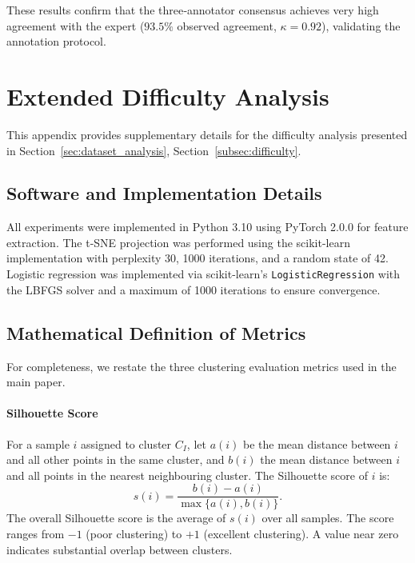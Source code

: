These results confirm that the three‑annotator consensus achieves very high agreement with the expert ($93.5\%$ observed agreement, $\kappa = 0.92$), validating the annotation protocol.










\section{Extended Difficulty Analysis}
\label{app:difficulty}

This appendix provides supplementary details for the difficulty analysis presented in Section~\ref{sec:dataset_analysis}, Section~\ref{subsec:difficulty}.

\subsection{Software and Implementation Details}

All experiments were implemented in Python 3.10 using PyTorch 2.0.0 for feature extraction. The t-SNE projection was performed using the scikit-learn implementation with perplexity 30, 1000 iterations, and a random state of 42. Logistic regression was implemented via scikit-learn's \texttt{LogisticRegression} with the LBFGS solver and a maximum of 1000 iterations to ensure convergence.

\subsection{Mathematical Definition of Metrics}

For completeness, we restate the three clustering evaluation metrics used in the main paper.

\paragraph{Silhouette Score}
For a sample \(i\) assigned to cluster \(C_I\), let \(a(i)\) be the mean distance between \(i\) and all other points in the same cluster, and \(b(i)\) the mean distance between \(i\) and all points in the nearest neighbouring cluster. The Silhouette score of \(i\) is:
\[
s(i) = \frac{b(i) - a(i)}{\max\{a(i), b(i)\}}.
\]
The overall Silhouette score is the average of \(s(i)\) over all samples. The score ranges from \(-1\) (poor clustering) to \(+1\) (excellent clustering). A value near zero indicates substantial overlap between clusters.

